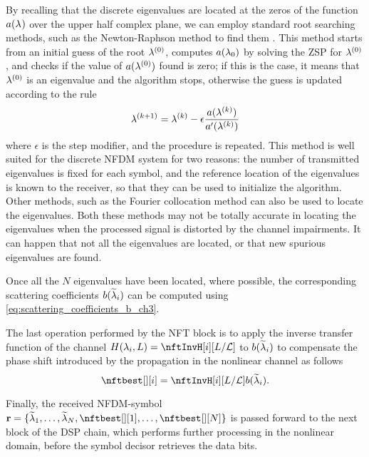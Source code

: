 By recalling that the discrete eigenvalues are located at the zeros of the
function $\nfta$ over the upper half complex plane, we can employ standard root
searching methods, such as the Newton-Raphson method to find them
\cite{Yousefi2014a}. This method starts from an initial guess of the root
$\eig^{(0)}$, computes $\nfta[0]$ by solving the \ac{ZSP} for $\eig^{(0)}$, and checks if the value of $a(\eig^{(0)})$ found is zero; if this is the case, it means that $\eig^{(0)}$ is an eigenvalue and the algorithm stops, otherwise the guess is updated according to the rule
\begin{equation}
  \eig^{(k+1)} = \eig^{(k)} - \epsilon\dfrac{a(\eig^{(k)})}{a'(\eig^{(k)})}
\end{equation}
where $\epsilon$ is the step modifier, and the procedure is repeated. This method is well suited for the discrete \ac{NFDM} system for two reasons: the number of transmitted eigenvalues is fixed for each symbol, and the reference location of the eigenvalues is known to the receiver, so that they can be used to initialize the algorithm. Other methods, such as the Fourier collocation method \cite{Yousefi2014a} can also be used to locate the eigenvalues. Both these methods may not be totally accurate in locating the eigenvalues when the processed signal is distorted by the channel impairments. It can happen that not all the eigenvalues are located, or that new spurious eigenvalues are found.

Once all the $N$ eigenvalues have been located, where possible, the corresponding scattering coefficients $b(\eigest[i])$ can be computed using \eqref{eq:scattering_coefficients_b_ch3}.

The last operation performed by the \ac{NFT} block is to apply the inverse transfer function of the channel $H(\eig[i], \fiberl) = \nftInvH[i][\fiberl / \nftcvL]$ to $b(\eigest[i])$ to compensate the phase shift introduced by the propagation in the nonlinear channel as follows
\begin{equation}\label{eq:apply_inverse_transfer_function}
 \nftbest[][i] = \nftInvH[i][\fiberl / \nftcvL]b(\eigest[i]).
\end{equation}

Finally, the received \ac{NFDM}-symbol  $\matr{r} = \nfdmsymrx$ is passed forward to the next block of the \ac{DSP} chain, which performs further processing in the nonlinear domain, before the symbol decisor retrieves the data bits.

